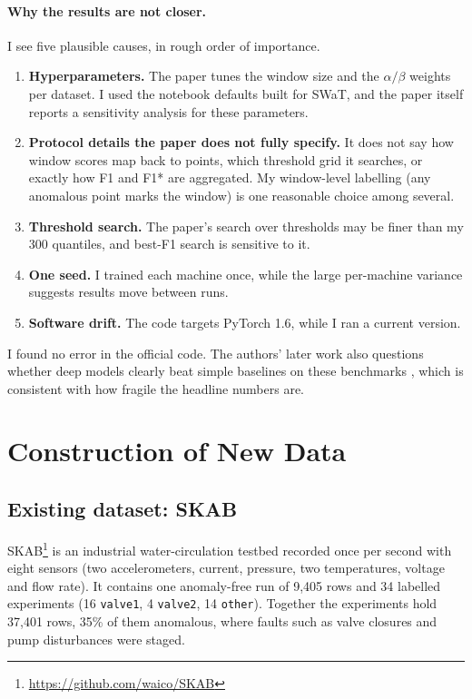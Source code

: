 \documentclass[11pt]{article}
\begin{document}
\paragraph{Why the results are not closer.} I see five plausible causes, in rough order of importance.
\begin{enumerate}
\item \textbf{Hyperparameters.} The paper tunes the window size and the $\alpha/\beta$ weights per dataset. I used the notebook defaults built for SWaT, and the paper itself reports a sensitivity analysis for these parameters.
\item \textbf{Protocol details the paper does not fully specify.} It does not say how window scores map back to points, which threshold grid it searches, or exactly how F1 and F1* are aggregated. My window-level labelling (any anomalous point marks the window) is one reasonable choice among several.
\item \textbf{Threshold search.} The paper's search over thresholds may be finer than my 300 quantiles, and best-F1 search is sensitive to it.
\item \textbf{One seed.} I trained each machine once, while the large per-machine variance suggests results move between runs.
\item \textbf{Software drift.} The code targets PyTorch 1.6, while I ran a current version.
\end{enumerate}
I found no error in the official code. The authors' later work also questions whether deep models clearly beat simple baselines on these benchmarks \citep{audibert2022deep}, which is consistent with how fragile the headline numbers are.

\section{Construction of New Data}
\label{sec:newdata}

\subsection{Existing dataset: SKAB}
SKAB\footnote{\url{https://github.com/waico/SKAB}} \citep{katser2020skab} is an industrial water-circulation testbed recorded once per second with eight sensors (two accelerometers, current, pressure, two temperatures, voltage and flow rate). It contains one anomaly-free run of 9,405 rows and 34 labelled experiments (16 \texttt{valve1}, 4 \texttt{valve2}, 14 \texttt{other}). Together the experiments hold 37,401 rows, 35\% of them anomalous, where faults such as valve closures and pump disturbances were staged.
\end{document}
